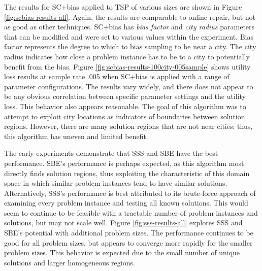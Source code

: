 The results for SC+bias applied to TSP of various sizes are shown in Figure \ref{fig:scbias-results-all}.  Again, the results are comparable to online repair, but not as good as other techniques.  SC+bias has \textit{bias factor} and \textit{city radius} parameters that can be modified and were set to various values within the experiment.  Bias factor represents the degree to which to bias sampling to be near a city.  The city radius indicates how close a problem instance has to be to a city to potentially benefit from the bias.  Figure \ref{fig:scbias-results-100city-005sample} shows utility loss results at sample rate .005 when SC+bias is applied with a range of parameter configurations.  The results vary widely, and there does not appear to be any obvious correlation between specific parameter settings and the utility loss.  This behavior also appears reasonable.  The goal of this algorithm was to attempt to exploit city locations as indicators of boundaries between solution regions.  However, there are many solution regions that are not near cities; thus, this algorithm has uneven and limited benefit.

The early experiments demonstrate that SSS and SBE have the best performance.  SBE's performance is perhaps expected, as this algorithm most directly finds solution regions, thus exploiting the characteristic of this domain space in which similar problem instances tend to have similar solutions.  Alternatively, SSS's performance is best attributed to its brute-force approach of examining every problem instance and testing all known solutions.  This would seem to continue to be feasible with a tractable number of problem instances and solutions, but may not scale well.  Figure \ref{fig:sss-results-all} explores SSS and SBE's potential with additional problem sizes.  The performance continues to be good for all problem sizes, but appears to converge more rapidly for the smaller problem sizes.  This behavior is expected due to the small number of unique solutions and larger homogeneous regions.








